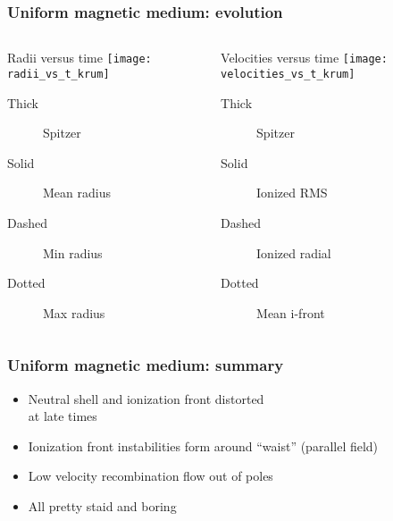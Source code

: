 \documentclass{beamer}
\begin{document}
\begin{frame}
  \frametitle{Uniform magnetic medium: evolution}
  \begin{columns}
    \begin{block}{Radii versus time}
      \smallskip
      \texttt{[image: radii\_vs\_t\_krum]}
      \begin{description}
      \item[Thick] Spitzer
      \item[Solid] Mean radius
      \item[Dashed] Min radius
      \item[Dotted] Max radius
      \end{description}
    \end{block}
    \begin{block}{Velocities versus time}
      \smallskip
      \texttt{[image: velocities\_vs\_t\_krum]}
      \begin{description}
      \item[Thick] Spitzer
      \item[Solid] Ionized RMS
      \item[Dashed] Ionized radial
      \item[Dotted] Mean i-front
      \end{description}
    \end{block}
  \end{columns}
  
\end{frame}


\begin{frame}
  \frametitle{Uniform magnetic medium: summary}
  \linespread{1.3}\selectfont
  \begin{itemize}
  \item Neutral shell and ionization front distorted\\ at late times
  \item Ionization front instabilities form around ``waist'' (parallel field)
  \item Low velocity recombination flow out of poles
  \item \alert{All pretty staid and boring}
  \end{itemize}
\end{frame}
\end{document}
